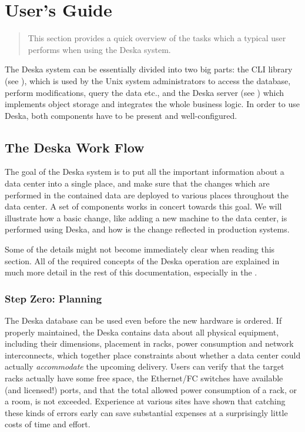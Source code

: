 \documentclass[deska]{subfiles}
\begin{document}
\chapter{User's Guide}
\label{sec:user-intro}

\begin{abstract}
This section provides a quick overview of the tasks which a typical user performs when using the Deska system.
\end{abstract}

The Deska system can be essentially divided into two big parts: the CLI library (see ), which is
used by the Unix system administrators to access the database, perform modifications, query the data etc., and the
Deska server (see ) which implements object
storage and integrates the whole business logic.  In order to use Deska, both components have to be present and
well-configured.

\section{The Deska Work Flow}
\label{sec:user-workflow}

The goal of the Deska system is to put all the important information about a data center into a single place, and make
sure that the changes which are performed in the contained data are deployed to various places throughout the data
center.  A set of components works in concert towards this goal. We will illustrate how a basic change, like adding a
new machine to the data center, is performed using Deska, and how is the change reflected in production systems.

Some of the details might not become immediately clear when reading this section.  All of the required concepts of the
Deska operation are explained in much more detail in the rest of this documentation, especially in the
.

\subsection{Step Zero: Planning}

The Deska database can be used even before the new hardware is ordered.  If properly maintained, the Deska contains data
about all physical equipment, including their dimensions, placement in racks, power consumption and network
interconnects, which together place constraints about whether a data center could actually {\em accommodate} the
upcoming delivery.  Users can verify that the target racks actually have some free space, the Ethernet/FC switches have
available (and licensed!) ports, and that the total allowed power consumption of a rack, or a room, is not exceeded.
Experience at various sites have shown that catching these kinds of errors early can save substantial expenses at a
surprisingly little costs of time and effort.
\end{document}
